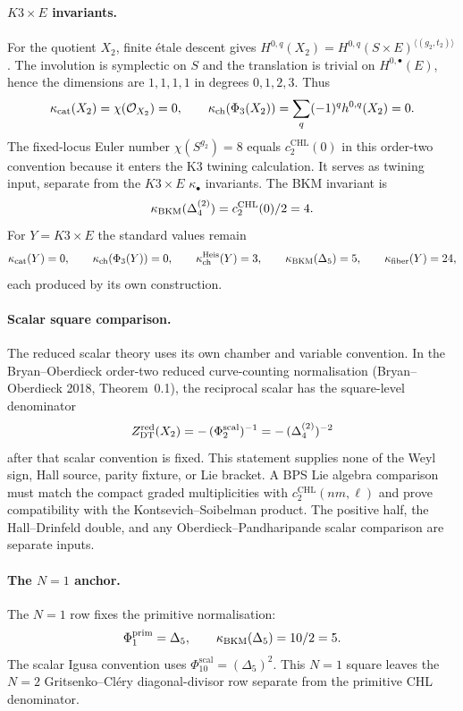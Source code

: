 \paragraph{$K3\times E$ invariants.}
For the quotient $X_2$, finite \'etale descent gives
$H^{0,q}(X_2)=H^{0,q}(S\times E)^{\langle(g_2,t_2)\rangle}$.
The involution is symplectic on $S$ and the translation is trivial on
$H^{0,\bullet}(E)$, hence the dimensions are $1,1,1,1$ in degrees
$0,1,2,3$.  Thus
\[
  \kappa_{\mathrm{cat}}(X_2)=\chi(\mathcal{O}_{X_2})=0,
  \qquad
  \kappa_{\mathrm{ch}}(\Phi_3(X_2))=\sum_q(-1)^q h^{0,q}(X_2)=0.
\]
The fixed-locus Euler number $\chi(S^{g_2})=8$ equals
$c^{\mathrm{CHL}}_2(0)$ in this order-two convention because it enters
the K3 twining calculation.  It serves as twining input, separate from
the $K3\times E$ $\kappa_\bullet$ invariants.  The BKM invariant is
\[
  \kappa_{\mathrm{BKM}}(\Delta_{4}^{(2)})=c^{\mathrm{CHL}}_2(0)/2=4.
\]
For $Y=K3\times E$ the standard values remain
\[
  \kappa_{\mathrm{cat}}(Y)=0,\qquad
  \kappa_{\mathrm{ch}}(\Phi_3(Y))=0,\qquad
  \kappa_{\mathrm{ch}}^{\mathrm{Heis}}(Y)=3,\qquad
  \kappa_{\mathrm{BKM}}(\Delta_5)=5,\qquad
  \kappa_{\mathrm{fiber}}(Y)=24,
\]
each produced by its own construction.

\paragraph{Scalar square comparison.}
The reduced scalar theory uses its own chamber and variable convention.
In the Bryan--Oberdieck order-two reduced curve-counting normalisation
(Bryan--Oberdieck 2018, Theorem~0.1), the reciprocal scalar has the
square-level denominator
\[
  Z^{\mathrm{red}}_{\mathrm{DT}}(X_2)
  = -\,(\Phi_{2}^{\mathrm{scal}})^{-1}
  = -\,(\Delta_{4}^{(2)})^{-2}
\]
after that scalar convention is fixed.  This statement supplies none of
the Weyl sign, Hall source, parity fixture, or Lie bracket.  A BPS Lie
algebra comparison must match the compact graded multiplicities with
$c^{\mathrm{CHL}}_2(nm,\ell)$ and prove compatibility with the
Kontsevich--Soibelman product.  The positive half, the Hall--Drinfeld
double, and any Oberdieck--Pandharipande scalar comparison are separate
inputs.

\paragraph{The $N=1$ anchor.}
The $N=1$ row fixes the primitive normalisation:
\[
  \Phi^{\mathrm{prim}}_1=\Delta_5,\qquad
  \kappa_{\mathrm{BKM}}(\Delta_5)=10/2=5.
\]
The scalar Igusa convention uses $\Phi_{10}^{\mathrm{scal}}=(\Delta_5)^2$.
This $N=1$ square leaves the $N=2$ Gritsenko--Cl\'ery diagonal-divisor
row separate from the primitive CHL denominator.


